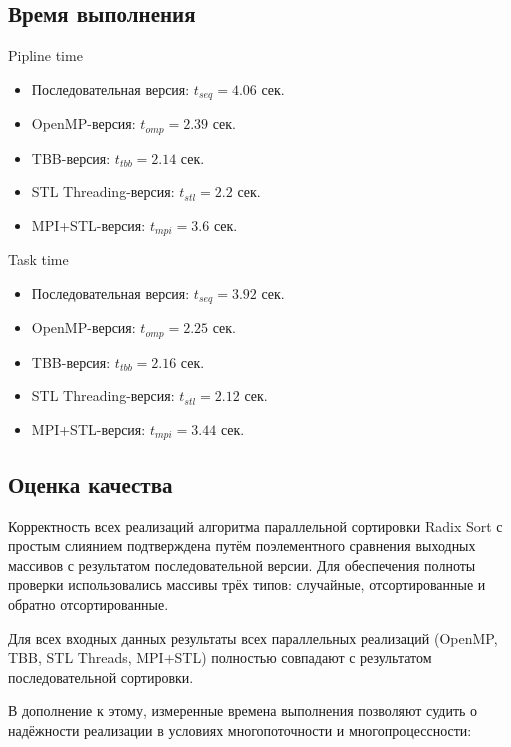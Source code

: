 \documentclass[a4paper,12pt]{article}
\begin{document}
\subsection{Время выполнения}
\begin{itemsize}
    \item Pipline time
    \begin{itemize}
        \item Последовательная версия: $t_{seq} = 4.06$ сек.
        \item OpenMP-версия: $t_{omp} = 2.39$ сек.
        \item TBB-версия: $t_{tbb} = 2.14$ сек.
        \item STL Threading-версия: $t_{stl} = 2.2$ сек.
        \item MPI+STL-версия: $t_{mpi} = 3.6$ сек.
    \end{itemize}
    \item Task time
    \begin{itemize}
        \item Последовательная версия: $t_{seq} = 3.92$ сек.
        \item OpenMP-версия: $t_{omp} = 2.25$ сек.
        \item TBB-версия: $t_{tbb} = 2.16$ сек.
        \item STL Threading-версия: $t_{stl} = 2.12$ сек.
        \item MPI+STL-версия: $t_{mpi} = 3.44$ сек.
    \end{itemize}
\end{itemsize}

\subsection{Оценка качества}

Корректность всех реализаций алгоритма параллельной сортировки Radix Sort с простым слиянием подтверждена путём поэлементного сравнения выходных массивов с результатом последовательной версии. Для обеспечения полноты проверки использовались массивы трёх типов: случайные, отсортированные и обратно отсортированные.

Для всех входных данных результаты всех параллельных реализаций (OpenMP, TBB, STL Threads, MPI+STL) полностью совпадают с результатом последовательной сортировки.


В дополнение к этому, измеренные времена выполнения позволяют судить о надёжности реализации в условиях многопоточности и многопроцессности:
\end{document}
